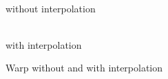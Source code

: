 \documentclass[12pt,a4paper,oneside,openright]{book}
\begin{document}
\begin{CJK}{UTF8}{}
\begin{figure}[htbp]
  \begin{center}
    \begin{minipage}[t]{.25\textwidth}
      \begin{center}
        \\
        without interpolation
      \end{center}
    \end{minipage}
    \begin{minipage}[t]{.25\textwidth}
      \begin{center}
        \\
        with interpolation
      \end{center}
    \end{minipage}
    \caption{Warp without and with interpolation\label{fig:lucas3}}
  \end{center}
\end{figure}


\end{CJK}
\end{document}
